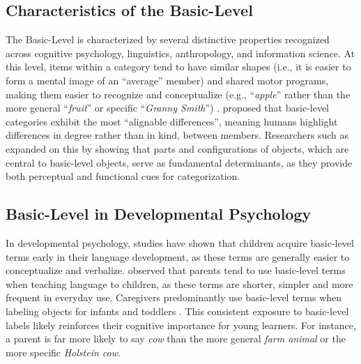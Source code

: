 \documentclass[preprint,12pt,authoryear]{elsarticle}
\begin{document}
\subsection{Characteristics of the Basic-Level}

The Basic-Level is characterized by several distinctive properties recognized across cognitive psychology, linguistics, anthropology, and information science. At this level, items within a category tend to have similar shapes (i.e., it is easier to form a mental image of an ``average'' member) and shared motor programs, making them easier to recognize and conceptualize (e.g., ``\textit{apple}'' rather than the more general ``\textit{fruit}'' or specific ``\textit{Granny Smith}'') \cite{hajibayova_basic-level_2013}. \citet{markman_similar_1997} proposed that basic-level categories exhibit the most ``alignable differences'', meaning humans highlight differences in degree rather than in kind, between members. Researchers such as \citet{tversky_objects_1984} expanded on this by showing that parts and configurations of objects, which are central to basic-level objects, serve as fundamental determinants, as they provide both perceptual and functional cues for categorization.

\subsection{Basic-Level in Developmental Psychology}

In developmental psychology, studies have shown that children acquire basic-level terms early in their language development, as these terms are generally easier to conceptualize and verbalize.  \citet{brown_how_1958} observed that parents tend to use basic-level terms when teaching language to children, as these terms are shorter, simpler and more frequent in everyday use.
Caregivers predominantly use basic-level terms when labeling objects for infants and toddlers \cite{Liu_2001}. This consistent exposure to basic-level labels likely reinforces their cognitive importance for young learners. For instance, a parent is far more likely to say \textit{cow} than the more general \textit{farm animal} or the more specific \textit{Holstein cow}.
\end{document}
